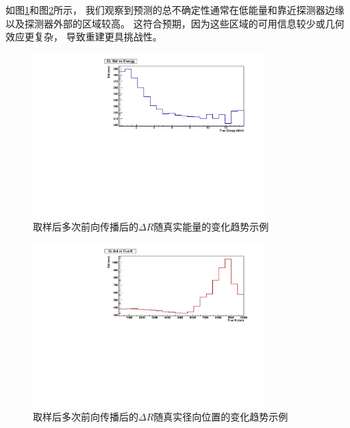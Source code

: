 

如图\ref{fig:uq_vs_energy}和图\ref{fig:uq_vs_radius}所示，
我们观察到预测的总不确定性通常在低能量和靠近探测器边缘以及探测器外部的区域较高。
这符合预期，因为这些区域的可用信息较少或几何效应更复杂，
导致重建更具挑战性。
\begin{figure}[htbp]
    \centering
    \includegraphics[width=0.8\textwidth]{figures/mean_dl_3d_std_vs_energy.pdf}
    \caption{取样后多次前向传播后的$\Delta R$随真实能量的变化趋势示例}
    \label{fig:uq_vs_energy}
\end{figure}

\begin{figure}[htbp]
    \centering
    \includegraphics[width=0.8\textwidth]{figures/mean_dl_3d_std_vs_trueR.pdf}
    \caption{取样后多次前向传播后的$\Delta R$随真实径向位置的变化趋势示例}
    \label{fig:uq_vs_radius}
\end{figure}



